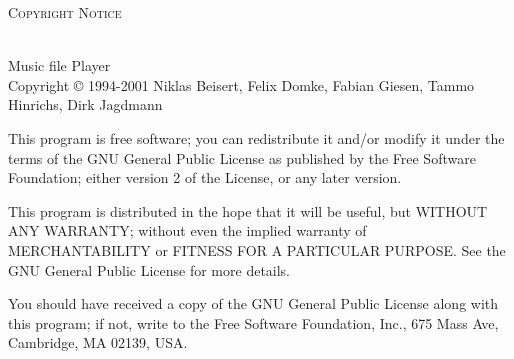 
\mbox{}
\vfill
\begin{center}
  \large\textsc{Copyright Notice}
\end{center}

\begin{list}{}{
  \setlength{\leftmargin}{0cm}
  \setlength{\rightmargin}{0cm}
  \setlength{\labelwidth}{0cm}
  \setlength{\labelsep}{0cm}
  \setlength{\itemindent}{0cm}
  \setlength{\listparindent}{0cm}
  \setlength{\parsep}{1em}
}
\item
\cp\ \cpversion\\
Music file Player\\
Copyright \copyright{} 1994-2001 Niklas Beisert, Felix Domke, Fabian Giesen,
Tammo Hinrichs,  Dirk Jagdmann

This program is free software; you can redistribute it and/or modify
it under the terms of the GNU General Public License as published by
the Free Software Foundation; either version 2 of the License, or
any later version.

This program is distributed in the hope that it will be useful,
but WITHOUT ANY WARRANTY; without even the implied warranty of
MERCHANTABILITY or FITNESS FOR A PARTICULAR PURPOSE.  See the
GNU General Public License for more details.

You should have received a copy of the GNU General Public License
along with this program; if not, write to the Free Software
Foundation, Inc., 675 Mass Ave, Cambridge, MA 02139, USA.
\end{list}
